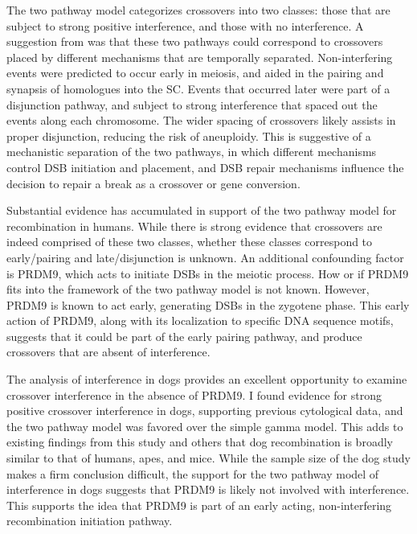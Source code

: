 The two pathway model categorizes crossovers into two classes: those that are subject to strong positive interference, and those with no interference.
A suggestion from \citet{Housworth2003} was that these two pathways could correspond to crossovers placed by different mechanisms that are temporally separated.
Non-interfering events were predicted to occur early in meiosis, and aided in the pairing and synapsis of homologues into the SC.
Events that occurred later were part of a disjunction pathway, and subject to strong interference that spaced out the events along each chromosome.
The wider spacing of crossovers likely assists in proper disjunction, reducing the risk of aneuploidy.
This is suggestive of a mechanistic separation of the two pathways, in which different mechanisms
control DSB initiation and placement, and DSB repair mechanisms influence the decision to repair a break as a crossover or gene conversion\cite{Baudat2007,Berchowitz2010,Stahl2010}.

Substantial evidence has accumulated in support of the two pathway model for recombination in humans\cite{Housworth2003,Fledel-Alon2009,Campbell2015}.
While there is strong evidence that crossovers are indeed comprised of these two classes, whether these classes correspond to early/pairing and late/disjunction is unknown.
An additional confounding factor is PRDM9, which acts to initiate DSBs in the meiotic process.
How or if PRDM9 fits into the framework of the two pathway model is not known.
However, PRDM9 is known to act early, generating DSBs in the zygotene phase\cite{Hayashi2005}.
This early action of PRDM9, along with its localization to specific DNA sequence motifs, suggests that it could be part of the early pairing pathway, and produce crossovers that are absent of interference.

The analysis of interference in dogs provides an excellent opportunity to examine crossover interference in the absence of PRDM9.
I found evidence for strong positive crossover interference in dogs, supporting previous cytological data\cite{Basheva2008}, and the two pathway model was favored over the simple gamma model.
This adds to existing findings from this study and others\cite{Axelsson2012,Auton2013,Wong2010} that dog recombination is broadly similar to that of humans, apes, and mice.
While the sample size of the dog study makes a firm conclusion difficult, 
the support for the two pathway model of interference in dogs suggests that PRDM9 is likely not involved with interference.
This supports the idea that PRDM9 is part of an early acting, non-interfering recombination initiation pathway.

